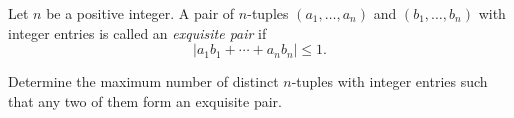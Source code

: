 Let $n$ be a positive integer. A pair of $n$-tuples $(a_1,\ldots, a_n)$ and $(b_1,\ldots, b_n)$ with integer entries is called an \emph{exquisite pair} if \[|a_1b_1+\cdots{}+a_nb_n|\le 1.\]

Determine the maximum number of distinct $n$-tuples with integer entries such that any two of them form an exquisite pair.